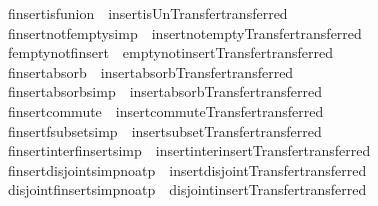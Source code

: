 \begin{isabellebody}
\isamarkupfalse%
\ finsert{\isacharunderscore}is{\isacharunderscore}funion\ {\isacharequal}\ insert{\isacharunderscore}is{\isacharunderscore}Un{\isacharbrackleft}Transfer{\isachardot}transferred{\isacharbrackright}\isanewline
{}\isamarkupfalse%
\ finsert{\isacharunderscore}not{\isacharunderscore}fempty{\isacharbrackleft}simp{\isacharbrackright}\ {\isacharequal}\ insert{\isacharunderscore}not{\isacharunderscore}empty{\isacharbrackleft}Transfer{\isachardot}transferred{\isacharbrackright}\isanewline
{}\isamarkupfalse%
\ fempty{\isacharunderscore}not{\isacharunderscore}finsert\ {\isacharequal}\ empty{\isacharunderscore}not{\isacharunderscore}insert{\isacharbrackleft}Transfer{\isachardot}transferred{\isacharbrackright}\isanewline
{}\isamarkupfalse%
\ finsert{\isacharunderscore}absorb\ {\isacharequal}\ insert{\isacharunderscore}absorb{\isacharbrackleft}Transfer{\isachardot}transferred{\isacharbrackright}\isanewline
{}\isamarkupfalse%
\ finsert{\isacharunderscore}absorb{}{\isacharbrackleft}simp{\isacharbrackright}\ {\isacharequal}\ insert{\isacharunderscore}absorb{}{\isacharbrackleft}Transfer{\isachardot}transferred{\isacharbrackright}\isanewline
{}\isamarkupfalse%
\ finsert{\isacharunderscore}commute\ {\isacharequal}\ insert{\isacharunderscore}commute{\isacharbrackleft}Transfer{\isachardot}transferred{\isacharbrackright}\isanewline
{}\isamarkupfalse%
\ finsert{\isacharunderscore}fsubset{\isacharbrackleft}simp{\isacharbrackright}\ {\isacharequal}\ insert{\isacharunderscore}subset{\isacharbrackleft}Transfer{\isachardot}transferred{\isacharbrackright}\isanewline
{}\isamarkupfalse%
\ finsert{\isacharunderscore}inter{\isacharunderscore}finsert{\isacharbrackleft}simp{\isacharbrackright}\ {\isacharequal}\ insert{\isacharunderscore}inter{\isacharunderscore}insert{\isacharbrackleft}Transfer{\isachardot}transferred{\isacharbrackright}\isanewline
{}\isamarkupfalse%
\ finsert{\isacharunderscore}disjoint{\isacharbrackleft}simp{\isacharcomma}no{\isacharunderscore}atp{\isacharbrackright}\ {\isacharequal}\ insert{\isacharunderscore}disjoint{\isacharbrackleft}Transfer{\isachardot}transferred{\isacharbrackright}\isanewline
{}\isamarkupfalse%
\ disjoint{\isacharunderscore}finsert{\isacharbrackleft}simp{\isacharcomma}no{\isacharunderscore}atp{\isacharbrackright}\ {\isacharequal}\ disjoint{\isacharunderscore}insert{\isacharbrackleft}Transfer{\isachardot}transferred{\isacharbrackright}\isanewline

\end{isabellebody}
